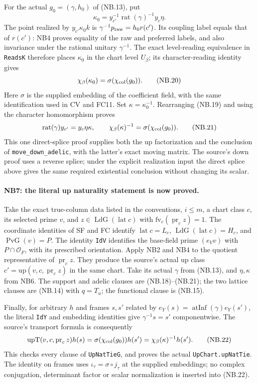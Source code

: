 For the actual $g_0=(\gamma,h_0)$ of (NB.13), put
\[
 \kappa_0=y_{c'}^{-1}\operatorname{rat}(\gamma)^{-1}y_c\eta.
                                                               \tag{NB.19}
\]
The point realized by $y_{c'}\kappa_0k$ is
$\gamma^{-1}p_{\rm raw}=h_0r(c')$. Its coupling label equals that
of $r(c')$: NB4 proves equality of the raw and preferred labels,
and also invariance under the rational unitary $\gamma^{-1}$.
The exact level-reading equivalence in \texttt{ReadsK} therefore
places $\kappa_0$ in the chart level $U_\beta$; its character-reading
identity gives
\[
 \chi_\beta(\kappa_0)=\sigma(\chi_{\rm col}(g_0)).  \tag{NB.20}
\]
Here $\sigma$ is the supplied embedding of the coefficient field,
with the same identification used in CV and FC11. Set
$\kappa=\kappa_0^{-1}$. Rearranging (NB.19) and using the character
homomorphism proves
\[
 \operatorname{rat}(\gamma)y_{c'}=y_c\eta\kappa,
 \qquad \chi_\beta(\kappa)^{-1}
                   =\sigma(\chi_{\rm col}(g_0)).     \tag{NB.21}
\]
This one direct-splice proof supplies both the up factorization and
the conclusion of \texttt{move\_down\_adelic}, with the latter's
exact moving matrix. The source's down proof uses a reverse splice;
under the explicit realization input the direct splice above gives
the same required existential conclusion without changing its scalar.

\paragraph{NB7: the literal up naturality statement is now proved.}
Take the exact true-column data listed in the conventions, $i\le m$,
a chart class $c$, its selected prime $v$, and
$z\in\operatorname{LdG}(\operatorname{lat}c)$ with
$\mathrm{fv}_c(\operatorname{pr}_c z)=1$.
The coordinate identities of SF and FC identify
$\operatorname{lat}c=L_c$, $\operatorname{LdG}(\operatorname{lat}c)=H_c$,
and $\operatorname{PvG}(v)=P$. The identity \texttt{IdV} identifies
the base-field prime $(e_Vv)$ with $P\cap\mathcal O_F$, with its prescribed
orientation. Apply NB2 and NB4 to the quotient representative of
$\operatorname{pr}_c z$. They produce the source's actual up class
$c'=\mathrm{up}(v,c,\operatorname{pr}_c z)$ in the same chart.
Take its actual $\gamma$ from (NB.13), and $\eta,\kappa$ from NB6.
The support and adelic clauses are (NB.18)--(NB.21); the two lattice
clauses are (NB.14) with $q=T_u$; the functional clause is (NB.15).

Finally, for arbitrary $h$ and frames $s,s'$ related by
$e_Y(s)=\operatorname{atInf}(\gamma)e_Y(s')$, the literal
\texttt{IdY} and embedding identities give $\gamma^{-1}s=s'$
componentwise. The source's transport formula is consequently
\[
 \mathrm{upT}(v,c,\operatorname{pr}_c z)h(s)
       =\sigma(\chi_{\rm col}(g_0))h(s')
       =\chi_\beta(\kappa)^{-1}h(s').                \tag{NB.22}
\]
This checks every clause of \texttt{UpNatTieG}, and proves the actual
\texttt{UpChart.upNatTie}. The identity on frames uses
$\iota_\tau=\sigma\circ j_\tau$ at the supplied embeddings; no
complex conjugation, determinant factor or scalar normalization is
inserted into (NB.22).

